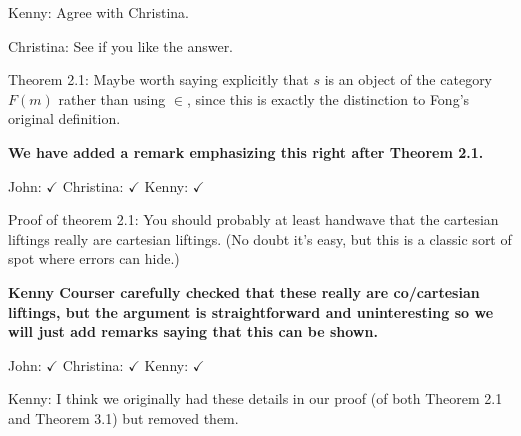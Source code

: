 \documentclass[reqno]{amsart}
\def\chris{\color{purple} Christina: }
\def\john{\color{red} John: }
\def\kenny{\color{blue} Kenny: }
\begin{document}
\begin{enumerate}
{{\kenny Agree with Christina.}

{\chris See if you like the answer.}
\fi




\item Theorem 2.1: Maybe worth saying explicitly that $s$ is an object of the category $F(m)$ rather than using $\in$, since this is exactly the  distinction to  Fong's original definition.

{\bf  We have added a remark emphasizing this right after Theorem 2.1.}   

{\john $\checkmark$} {\chris $\checkmark$} {\kenny $\checkmark$}




\item Proof of theorem 2.1: You should probably at least handwave that the cartesian liftings really are cartesian liftings. (No doubt it’s easy, but 
this 
is a classic sort of spot where errors can hide.)

\textbf{Kenny Courser carefully checked that these really are co/cartesian liftings, but the argument is straightforward and uninteresting so we will just 
add remarks saying that this can be shown.}   

{\john $\checkmark$} {\chris $\checkmark$} {\kenny $\checkmark$}

\iffalse
{\kenny I think we originally had these details in our proof (of both Theorem 2.1 and Theorem 3.1) but removed them.}

}
\end{enumerate}
\end{document}
